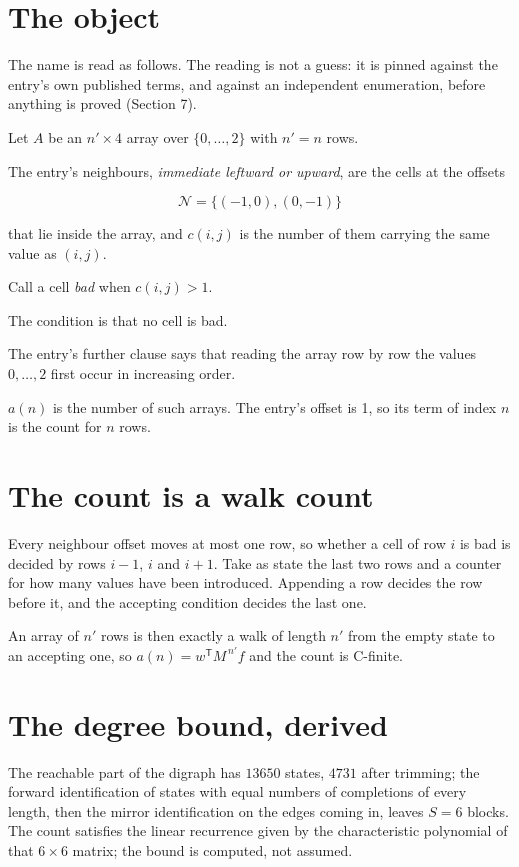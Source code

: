 \documentclass[11pt]{article}
\theoremstyle{definition}
\begin{document}
\section{The object}

The name is read as follows. The reading is not a guess: it is pinned against the entry's own published terms, and against an independent enumeration, before anything is proved (Section 7).

Let $A$ be an $n' \times 4$ array over $\{0,\dots,2\}$ with $n' = n$ rows.

The entry's neighbours, {\itshape immediate leftward or upward}, are the cells at the offsets

\[\mathcal{N} = \{(-1,0), (0,-1)\}\]

that lie inside the array, and $c(i,j)$ is the number of them carrying the same value as $(i,j)$.

Call a cell {\itshape bad} when $c(i,j) > 1$.

The condition is that no cell is bad.

The entry's further clause says that reading the array row by row the values $0,\dots,2$ first occur in increasing order.

$a(n)$ is the number of such arrays. The entry's offset is 1, so its term of index $n$ is the count for $n$ rows.

\section{The count is a walk count}

Every neighbour offset moves at most one row, so whether a cell of row $i$ is bad is decided by rows $i-1$, $i$ and $i+1$. Take as state the last two rows and a counter for how many values have been introduced. Appending a row decides the row before it, and the accepting condition decides the last one.

An array of $n'$ rows is then exactly a walk of length $n'$ from the empty state to an accepting one, so $a(n) = w^{\mathsf T}M^{\,n'}f$ and the count is C-finite.

\section{The degree bound, derived}

The reachable part of the digraph has $13650$ states, $4731$ after trimming; the forward identification of states with equal numbers of completions of every length, then the mirror identification on the edges coming in, leaves $S = 6$ blocks. The count satisfies the linear recurrence given by the characteristic polynomial of that $6\times6$ matrix; the bound is computed, not assumed.
\end{document}
